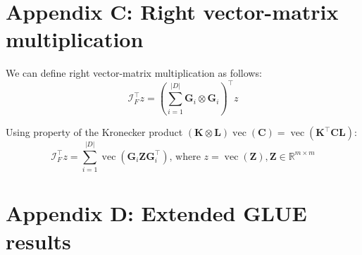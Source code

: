 \documentclass{article}
\DeclareMathOperator{\vect}{vec}
\begin{document}



\section{Appendix C: Right vector-matrix multiplication}
\label{sec:appendixb}
We can define right vector-matrix multiplication as follows:
\begin{equation}
\mathcal{I}_F^\top z = (\sum_{i=1}^{|D|} \mathbf{G}_i \otimes \mathbf{G}_i)^\top z
\end{equation}

Using property of the Kronecker product $(\mathbf{K}\otimes \mathbf{L}) \vect(\mathbf{C}) = \vect(\mathbf{K^\top} \mathbf{C} \mathbf{L})$:
\begin{equation}
\label{eq:rmatvec}
\mathcal{I}_F^\top z = \sum_{i=1}^{|D|} \vect(\mathbf{G}_i \mathbf{Z} \mathbf{G}_i^\top) \text{, where } z =  \vect(\mathbf{Z}), \mathbf{Z} \in \mathbb{R}^{m\times m} 
\end{equation}

\section{Appendix D: Extended GLUE results}
\label{appendix:glue}
\end{document}
